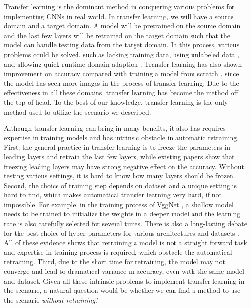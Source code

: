 \documentclass{article}
\begin{document}
Transfer learning is the dominant method in conquering various problems for implementing CNNs in real world. In transfer learning, we will have a source domain and a target domain. A model will be pretrained on the source domain and the last few layers will be retrained on the target domain such that the model can handle testing data from the target domain. In this process, various problems could be solved, such as lacking training data, using unlabeled data \cite{doersch2015unsupervised, noroozi2016unsupervised}, and allowing quick runtime domain adaption \cite{han2016mcdnn, shen2017fast}. Transfer learning has also shown improvement on accuracy compared with training a model from scratch \cite{oquab2014learning, yosinski2014transferable}, since the model has seen more images in the process of transfer learning. Due to the effectiveness in all these domains, transfer learning has become the method off the top of head. To the best of our knowledge, transfer learning is the only method used to utilize the scenario we described.


{\color{blue} Although transfer learning can bring in many benefits, it also has requires expertise in training models and has intrinsic obstacle in automatic retraining. First, the general practice in transfer learning is to freeze the parameters in leading layers and retrain the last few layers, while existing papers \cite{yosinski2014transferable} show that freezing leading layers may have strong negative effect on the accuracy. Without testing various settings, it is hard to know how many layers should be frozen. Second, the choice of training step depends on dataset and a unique setting is hard to find, which makes automatical transfer learning very hard, if not impossible. For example, in the training process of VggNet \cite{simonyan2014very}, a shallow model needs to be trained to initialize the weights in a deeper model and the learning rate is also carefully selected for several times. There is also a long-lasting debate for the best choice of hyper-parameters for various architectures and datasets \cite{bergstra2012random,  glorot2010understanding, he2015delving, smith2017don, wilson2003general}. All of these evidence shows that retraining a model is not a straight forward task and expertise in training process is required, which obstacle the automatical retraining.  Third, due to the short time for retraining, the model may not converge and lead to dramatical variance in accuracy, even with the same model and dataset. Given all these intrinsic problems to implement transfer learning in the scenario, a natural question would be whether we can find a method to use the scenario \textit{without retraining}? }
\end{document}
